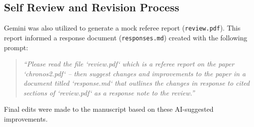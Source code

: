 \documentclass[twocolumn]{article}
\begin{document}
\subsection*{Self Review and Revision Process}
Gemini was also utilized to generate a mock referee report (\texttt{review.pdf}). This report informed a response document (\texttt{responses.md}) created with the following prompt: 
\begin{quote}
    \textit{``Please read the file ‘review.pdf‘ which is a referee report on the paper ‘chronos2.pdf‘ – then suggest changes and improvements to the paper in a document titled ‘response.md‘ that outlines the changes in response to cited sections of ‘review.pdf‘ as a response note to the review.''}
\end{quote}
Final edits were made to the manuscript based on these AI-suggested improvements. 

\end{document}
